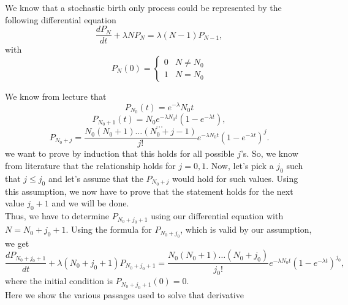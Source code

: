 We know that a stochastic birth only process could be represented by the following differential equation
$$
\frac{dP_{N}}{dt} + \lambda NP_{N} = \lambda (N-1)P_{N-1},
$$
with 
\[ 
P_{N}(0) =  
\begin{cases} 
      					0 & N\neq N_{0} \\
     					 1 & N =  N_{0} 
\end{cases}
\]

We know from lecture that 
$$
P_{N_{0}}(t) = e^{-\lambda}N_{0}t
$$
$$
P_{N_{0}+1}(t) = N_{0}e^{-\lambda N_{0}t}(1-e^{-\lambda t}),
$$ 
$$
\dots
$$
$$
P_{N_{0}+j}=\frac{N_{0}(N_{0}+1)\dots(N_{0}+j-1)}{j!}e^{-\lambda N_{0}t}(1-e^{-\lambda t})^{j}.
$$
we want to prove by induction that this holds for all possible $j$'s.
So, we know from literature that the relationship holds for $j=0,1$. Now, let's pick a $j_{0}$ such that $j \leq j_{0}$ and let's assume that the $P_{N_{0}+j}$ would hold for such values.
Using this assumption, we now have to prove that the statement holds for the next value $j_{0}+1$ and we will be done.\\
Thus, we have to determine $P_{N_{0}+j_{0}+1}$ using our differential equation with $N=N_{0}+j_{0}+1$. Using the formula for $P_{N_{0}+j_{0}}$, which is valid by our assumption, we get
$$
\frac{dP_{N_{0}+j_{0}+1}}{dt} + \lambda (N_{0}+j_{0}+1)P_{N_{0}+j_{0}+1} = \frac{N_{0}(N_{0}+1)\dots(N_{0}+j_{0})}{j_{0}!} e^{-\lambda N_{0} t} (1-e^{-\lambda t})^{j_{0}},
$$
where the initial condition is $P_{N_{0}+j_{0}+1}(0)=0$.\\
Here we show the various passages used to solve that derivative
